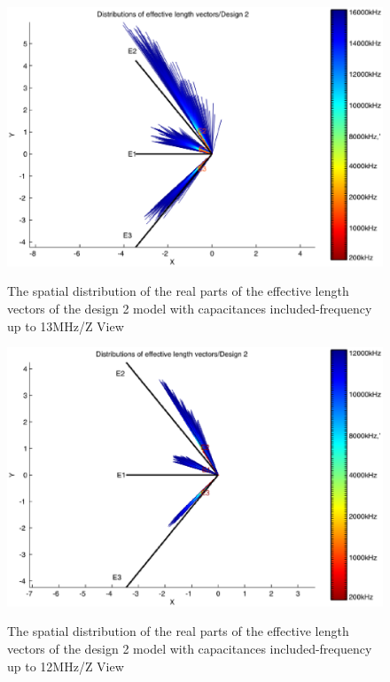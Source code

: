 \documentclass[a4paper,10pt]{thesis}
\begin{document}
\begin{figure}
\begin{center}
\includegraphics[scale=0.65]{HeffVerteilungD2-ZView_caps2.eps} \\
\caption{The spatial distribution of the real parts of the effective length vectors of the design 2 model with capacitances included-frequency up to 13MHz/Z View }\label{fig_heff_dist_D2_A_Z_View_caps2}
\end{center}
\end{figure}

\begin{figure}
\begin{center}
\includegraphics[scale=0.65]{HeffVerteilungD2-ZView_caps3.eps} \\
\caption{The spatial distribution of the real parts of the effective length vectors of the design 2 model with capacitances included-frequency up to 12MHz/Z View }\label{fig_heff_dist_D2_A_Z_View_caps3}
\end{center}
\end{figure}
\end{document}
